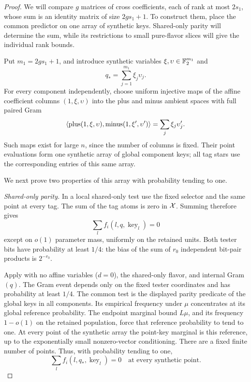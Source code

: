\begin{proof}
We will compare \(g\) matrices of cross coefficients, each of rank
at most \(2s_1\), whose sum is an identity matrix of size
\(2gs_1+1\). To construct them, place the common predictor on one
array of synthetic keys. Shared-only parity will determine the sum,
while its restrictions to small pure-flavor slices will give the
individual rank bounds.

Put \(m_1=2gs_1+1\), and introduce synthetic variables
\(\xi,\upsilon\in\mathbb F_2^{m_1}\) and
\[
 q_*=\sum_{j=1}^{m_1}\xi_j\upsilon_j.
 \]
For every component independently, choose uniform injective
maps of the affine coefficient columns
\((1,\xi,\upsilon)\) into the plus and minus ambient spaces
with full paired Gram
\[
 \langle \text{plus}(1,\xi,\upsilon),\text{minus}(1,\xi',\upsilon')\rangle
 =\sum_j\xi_j\upsilon'_j.
 \]
Such maps exist for large \(n\), since the number of columns
is fixed.  Their point evaluations form one synthetic array
of global component keys; all tag stars use the corresponding
entries of this same array.

We next prove two properties of this array with probability
tending to one.

\medskip\noindent
\emph{Shared-only parity.}
In a local shared-only test use the fixed selector and the
same point at every tag.  The sum of the tag atoms is zero
in \(\mathcal X\).  Summing  therefore gives
\[
 \sum_l f_i(l,q,\operatorname{key}_l)=0
 \]
except on \(o(1)\) parameter mass, uniformly on the retained
units.  Both tester bits have probability at least \(1/4\):
the bias of the sum of \(r_0\) independent bit-pair products
is \(2^{-r_0}\).

Apply  with no affine variables
(\(d=0\)), the shared-only flavor, and internal Gram \((q)\).
The Gram event depends only on the fixed tester coordinates
and has probability at least \(1/4\).  The common test is
the displayed parity predicate of the global keys in all
components.  Its empirical frequency under \(\mu\) concentrates
at its global reference probability.  The endpoint marginal
bound \(L\mu\), and its frequency \(1-o(1)\) on the retained
population, force that reference probability to tend to one.
At every point of the synthetic array the point-key marginal
is this reference, up to the exponentially small nonzero-vector
conditioning.  There are a fixed finite number of points.
Thus, with probability tending to one,
\begin{equation}
 \sum_l f_i(l,q_*,\operatorname{key}_l)=0
 \quad\text{at every synthetic point}.
 \label{eq:synthetic-parity}
\end{equation}


\end{proof}
